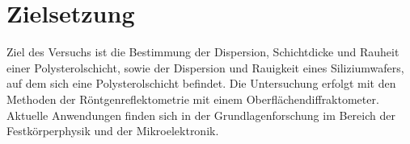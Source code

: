\section{Zielsetzung}
Ziel des Versuchs ist die Bestimmung der Dispersion, Schichtdicke und Rauheit einer Polysterolschicht,
sowie der Dispersion und Rauigkeit eines Siliziumwafers, auf dem sich eine Polysterolschicht befindet.
Die Untersuchung erfolgt mit den Methoden der Röntgenreflektometrie mit einem Oberflächendiffraktometer.
Aktuelle Anwendungen finden sich in der Grundlagenforschung im Bereich der Festkörperphysik und der
Mikroelektronik.